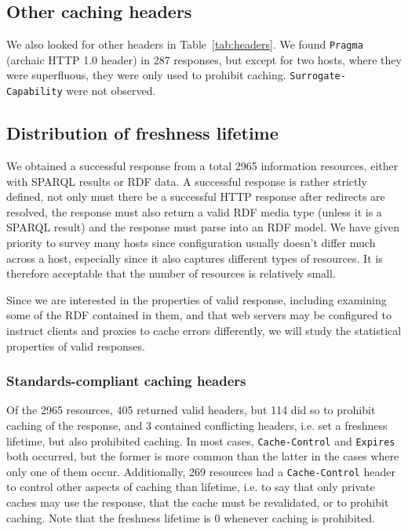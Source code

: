 \documentclass{llncs}
\newcommand{\httph}[1]{\texttt{#1}}
\begin{document}
\subsection{Other caching headers}

We also looked for other headers in Table~\ref{tab:headers}. We found
\httph{Pragma} (archaic HTTP 1.0 header) in 287 responses, but except
for two hosts, where they were superfluous, they were only used to
prohibit caching. \httph{Surrogate-Capability} were not observed.

\subsection{Distribution of freshness lifetime}

We obtained a successful response from a total 2965 information
resources, either with SPARQL results or RDF data. A successful
response is rather strictly defined, not only must there be a
successful HTTP response after redirects are resolved, the response
must also return a valid RDF media type (unless it is a SPARQL result)
and the response must parse into an RDF model. We have given priority
to survey many hosts since configuration usually doesn't differ much
across a host, especially since it also captures different types of
resources. It is therefore acceptable that the number of resources is
relatively small.


Since we are interested in the properties of valid response, including
examining some of the RDF contained in them, and that web servers may
be configured to instruct clients and proxies to cache errors
differently, we will study the statistical properties of valid
responses.

\subsubsection{Standards-compliant caching headers}

Of the 2965 resources, 405 returned valid headers, but 114 did so to
prohibit caching of the response, and 3 contained conflicting
headers, i.e. set a freshness lifetime, but also prohibited
caching. In most cases, \httph{Cache-Control} and \httph{Expires} both
occurred, but the former is more common than the latter in the cases
where only one of them occur.  Additionally, 269 resources had a
\httph{Cache-Control} header to control other aspects of caching than
lifetime, i.e. to say that only private caches may use the response,
that the cache must be revalidated, or to prohibit caching. 
Note that the freshness lifetime is 0 whenever caching is prohibited.
\end{document}
